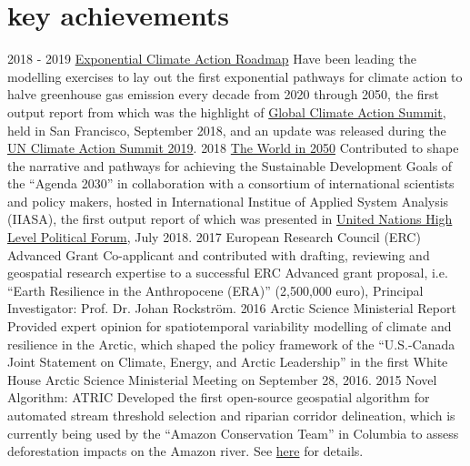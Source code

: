 \documentclass[]{friggeri-cv} %
\begin{document}
\section{key achievements}

\begin{entrylist}
\entry
{\small{2018 - 2019}}
{\href{https://exponentialroadmap.org}{Exponential Climate Action Roadmap}} 
{}
{Have been leading the modelling exercises to lay out the first exponential pathways for climate action to halve greenhouse gas emission every decade from 2020 through 2050, the first output report from which was the highlight of \href{https://www.globalclimateactionsummit.org}{Global Climate Action Summit}, held in San Francisco, September 2018, and an update was released during the \href{https://www.un.org/en/climatechange/un-climate-summit-2019.shtml}{UN Climate Action Summit 2019}.}
\entry
{\small{2018}}
{\href{http://www.iiasa.ac.at/web/home/research/twi/TWI2050.html}{The World in 2050}} 
{}
{Contributed to shape the narrative and pathways for achieving the Sustainable Development Goals of the ``Agenda 2030'' in collaboration with a consortium of international scientists and policy makers, hosted in International Institue of Applied System Analysis (IIASA), the first output report of which was presented in \href{https://sustainabledevelopment.un.org/hlpf/2018}{United Nations High Level Political Forum}, July 2018.}
\entry
{\small{2017}}
{European Research Council (ERC) Advanced Grant} 
{}
{Co-applicant and contributed with drafting, reviewing and geospatial research expertise to a successful ERC Advanced grant proposal, i.e. ``Earth Resilience in the Anthropocene (ERA)'' (2,500,000 euro), Principal Investigator: Prof. Dr. Johan Rockström.}
\entry
{\small{2016}}
{Arctic Science Ministerial Report} 
{}
{Provided expert opinion for spatiotemporal variability modelling of climate and resilience in the Arctic, which shaped the policy framework of the ``U.S.-Canada Joint Statement on Climate, Energy, and Arctic Leadership'' in the first White House Arctic Science Ministerial Meeting on September 28, 2016.}
\entry
{\small{2015}}
{Novel Algorithm: ATRIC}
{}
{Developed the first open-source geospatial algorithm for automated stream threshold selection and riparian corridor delineation, which is currently being used by the ``Amazon Conservation Team'' in Columbia to assess deforestation impacts on the Amazon river. See \href{http://www.sciencedirect.com/science/article/pii/S1364815214003077}{here} for details.}

\end{entrylist}
\end{document}
